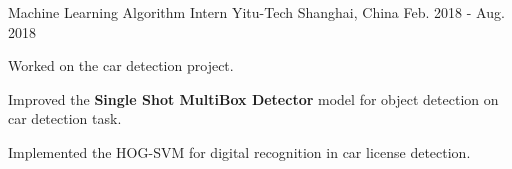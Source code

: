 \begin{cventries}
\cventry
    {Machine Learning Algorithm Intern} %
    {Yitu-Tech} %
    {Shanghai, China} %
    {Feb. 2018 - Aug. 2018} %
    {
      \begin{cvitems} %
       \item {Worked on the car detection project.}
        \item {Improved the \textbf{Single Shot MultiBox Detector} model for object detection on car detection task.}
        \item {Implemented the HOG-SVM for digital recognition in car license detection.}
      \end{cvitems}
    }
        
\end{cventries}
